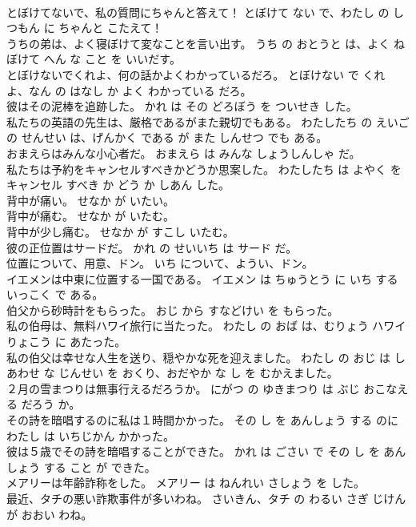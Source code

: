 \documentclass[8pt]{extreport}
\begin{document}
\begin{CJK}{UTF8}{min}
\\	とぼけてないで、私の質問にちゃんと答えて！	とぼけて ない で、わたし の しつもん に ちゃんと こたえて！	
\\	うちの弟は、よく寝ぼけて変なことを言い出す。	うち の おとうと は、よく ねぼけて へん な こと を いいだす。	
\\	とぼけないでくれよ、何の話かよくわかっているだろ。	とぼけない で くれ よ、なん の はなし か よく わかっている だろ。	
\\	彼はその泥棒を追跡した。	かれ は その どろぼう を ついせき した。	
\\	私たちの英語の先生は、厳格であるがまた親切でもある。	わたしたち の えいご の せんせい は、げんかく である が また しんせつ でも ある。	
\\	おまえらはみんな小心者だ。	おまえら は みんな しょうしんしゃ だ。	
\\	私たちは予約をキャンセルすべきかどうか思案した。	わたしたち は よやく を キャンセル すべき か どう か しあん した。	
\\	背中が痛い。	せなか が いたい。	
\\	背中が痛む。	せなか が いたむ。	
\\	背中が少し痛む。	せなか が すこし いたむ。	
\\	彼の正位置はサードだ。	かれ の せいいち は サード だ。	
\\	位置について、用意、ドン。	いち について、ようい、ドン。	
\\	イエメンは中東に位置する一国である。	イエメン は ちゅうとう に いち する いっこく で ある。	
\\	伯父から砂時計をもらった。	おじ から すなどけい を もらった。	
\\	私の伯母は、無料ハワイ旅行に当たった。	わたし の おば は、むりょう ハワイ りょこう に あたった。	
\\	私の伯父は幸せな人生を送り、穏やかな死を迎えました。	わたし の おじ は しあわせ な じんせい を おくり、おだやか な し を むかえました。	
\\	２月の雪まつりは無事行えるだろうか。	にがつ の ゆきまつり は ぶじ おこなえる だろう か。	
\\	その詩を暗唱するのに私は１時間かかった。	その し を あんしょう する のに わたし は いちじかん かかった。	
\\	彼は５歳でその詩を暗唱することができた。	かれ は ごさい で その し を あんしょう する こと が できた。	
\\	メアリーは年齢詐称をした。	メアリー は ねんれい さしょう を した。	
\\	最近、タチの悪い詐欺事件が多いわね。	さいきん、タチ の わるい さぎ じけん が おおい わね。	

\end{CJK}
\end{document}
